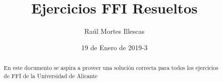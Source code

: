 \documentclass{article}
\title{Ejercicios FFI Resueltos}
\author{Raúl Mortes Illescas}
\date{19 de Enero de 2019-3}
\begin{document}
\begin{titlingpage}
    \maketitle
    \begin{abstract}
        En este documento se aspira a proveer una solución
        correcta para todos los ejercicios de FFI de la
        Universidad de Alicante
    \end{abstract}
\end{titlingpage}

\cleardoublepage

\tableofcontents

\cleardoublepage



\end{document}
